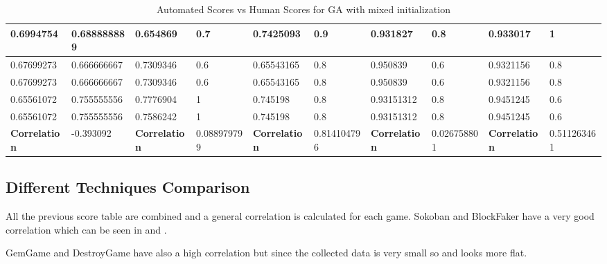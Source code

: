 \begin{landscape}
\begin{table}[!ht]
\begin{tabular}{|p{0.8in}|p{0.8in}|p{0.8in}|p{0.8in}|p{0.8in}|p{0.8in}|p{0.8in}|p{0.8in}|p{0.8in}|p{0.8in}|}
		\hline
		0.6994754 & 0.688888889 & 0.654869 & 0.7 & 0.7425093 & 0.9 & 0.931827 & 0.8 & 0.933017 & 1\\
		\hline
		0.67699273 & 0.666666667 & 0.7309346 & 0.6 & 0.65543165 & 0.8 & 0.950839 & 0.6 & 0.9321156 & 0.8\\
		\hline
		0.67699273 & 0.666666667 & 0.7309346 & 0.6 & 0.65543165 & 0.8 & 0.950839 & 0.6 & 0.9321156 & 0.8\\
		\hline
		0.65561072 & 0.755555556 & 0.7776904 & 1 & 0.745198 & 0.8 & 0.93151312 & 0.8 & 0.9451245 & 0.6\\
		\hline
		0.65561072 & 0.755555556 & 0.7586242 & 1 & 0.745198 & 0.8 & 0.93151312 & 0.8 & 0.9451245 & 0.6\\
		\hline
		\textbf{Correlation} & -0.393092 & \textbf{Correlation} & 0.088979799 & \textbf{Correlation} & 0.814104796 & \textbf{Correlation} & 0.026758801 & \textbf{Correlation} &0.511263461\\
		\hline
	\end{tabular}
	\caption{Automated Scores vs Human Scores for GA with mixed initialization}
	\label{Table:mixedGAScores}
\end{table}
\end{landscape}

\subsection{Different Techniques Comparison}
All the previous score table are combined and a general correlation is calculated for each game. Sokoban and BlockFaker have a very good correlation which can be seen in  and .



GemGame and DestroyGame  have also a high correlation but since the collected data is very small so  and  looks more flat.




